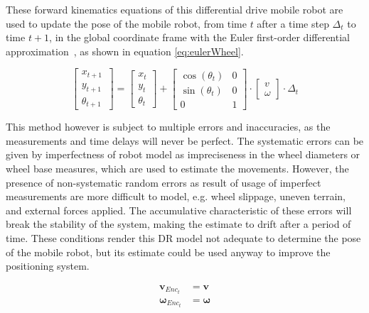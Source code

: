 These forward kinematics equations of this differential drive mobile robot are used to update the pose of the mobile robot, from time $t$ after a time step $\Delta_t$ to time $t+1$, in the global coordinate frame with the Euler first-order differential approximation~\cite{braun_first-order_1993}, as shown in equation \ref{eq:eulerWheel}.

\begin{equation}
\begin{bmatrix} x_{t + 1} \\ y_{t + 1} \\ \theta _{t + 1} ~ \end{bmatrix}
=
\begin{bmatrix} {x_t} \\ {y_t} \\ {\theta _t}  \end{bmatrix}
+
\begin{bmatrix}  \cos (\theta _t ) & 0\\  \sin (\theta _t ) & 0 \\ 0 & 1 \end{bmatrix}
\cdot
\begin{bmatrix} v \\ \omega \end{bmatrix} \cdot
\Delta_t
\label{eq:eulerWheel}
\end{equation}


This method however is subject to multiple errors and inaccuracies, as the measurements and time delays will never be perfect.
The systematic errors can be given by imperfectness of robot model as impreciseness in the wheel diameters or wheel base measures, which are used to estimate the movements.
However, the presence of non-systematic random errors as result of usage of imperfect measurements are more difficult to model, e.g. wheel slippage, uneven terrain, and external forces applied.
The accumulative characteristic of these errors will break the stability of the system, making the estimate to drift after a period of time.
These conditions render this \gls{DR} model not adequate to determine the pose of the mobile robot, but its estimate could be used anyway to improve the positioning system.




\begin{align}
\mathbf{v}_{Enc_t} & = \mathbf{v}\\
\boldsymbol \omega_{Enc_t} & = \boldsymbol \omega
\end{align}


